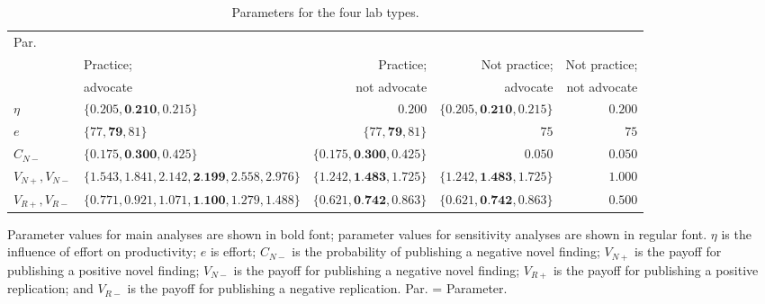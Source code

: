 \documentclass[meta, authordate]{jote-new-article}
\begin{document}
%
\begin{table}[!t]
  \begin{fullwidth}
    \begin{threeparttable}
      \caption{Parameters for the four lab types.}
      \label{tab:parameters}
      \begin{tabularx}{\textwidth}{@{}l>{\arraybackslash\RaggedLeft}Xrrr@{}}
        \toprule
        Par.             & \multicolumn{4}{c}{Value}                                                                                                                        \\
        \cmidrule{2-5}
                         & Practice;                                              & Practice;                          & Not practice;                      & Not practice; \\
                         & advocate                                               & not advocate                       & advocate                           & not advocate  \\
        \midrule
        $\eta$           & $\{0.205, \textbf{0.210}, 0.215\}$                     & $0.200$                            & $\{0.205, \textbf{0.210}, 0.215\}$ & $0.200$       \\
        $e$              & $\{77, \textbf{79}, 81\}$                              & $\{77, \textbf{79}, 81\}$          & $75$                               & $75$          \\
        $C_{N-}$         & $\{0.175, \textbf{0.300}, 0.425\}$                     & $\{0.175, \textbf{0.300}, 0.425\}$ & $0.050$                            & $0.050$       \\
        $V_{N+}, V_{N-}$ & $\{1.543, 1.841, 2.142,\textbf{2.199}, 2.558, 2.976\}$ & $\{1.242, \textbf{1.483}, 1.725\}$ & $\{1.242, \textbf{1.483}, 1.725\}$ & $1.000$       \\

        $V_{R+}, V_{R-}$ & $\{0.771, 0.921, 1.071,\textbf{1.100}, 1.279, 1.488\}$ & $\{0.621, \textbf{0.742}, 0.863\}$ & $\{0.621, \textbf{0.742}, 0.863\}$ & $0.500$       \\
        \midrule
      \end{tabularx}
      Parameter values for main analyses are shown in bold font; parameter values for sensitivity analyses are shown in regular font. $\eta$ is the influence of effort on productivity; $e$ is effort; $C_{N-}$ is the probability of publishing a negative novel finding; $V_{N+}$ is the payoff for publishing a positive novel finding; $V_{N-}$ is the payoff for publishing a negative novel finding; $V_{R+}$ is the payoff for publishing a positive replication; and $V_{R-}$ is the payoff for publishing a negative replication. Par. = Parameter.
    \end{threeparttable}
  \end{fullwidth}
\end{table}
%
\end{document}
